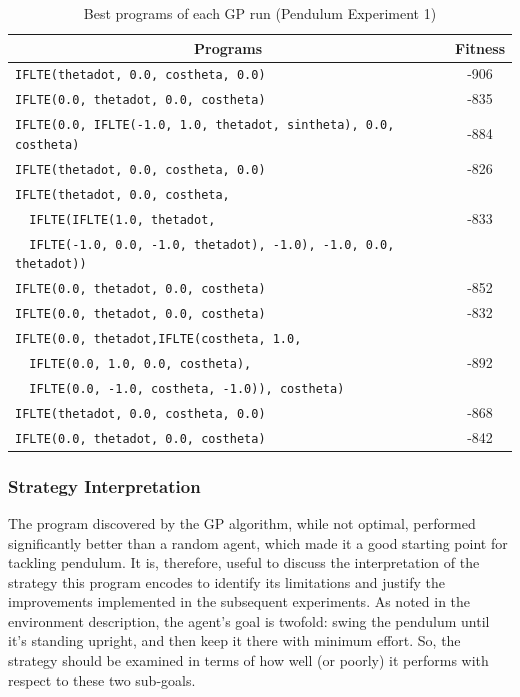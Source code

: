 \begin{table}[ht]
    \centering
    \begin{tabular}{|l|c|}
        \hline
        \multicolumn{1}{|c|}{\textbf{Programs}} & \textbf{Fitness} \\
        \hline
        
        \verb+IFLTE(thetadot, 0.0, costheta, 0.0)+ & -906  \\ \hline
        \verb+IFLTE(0.0, thetadot, 0.0, costheta)+ & -835  \\ \hline
        \verb+IFLTE(0.0, IFLTE(-1.0, 1.0, thetadot, sintheta), 0.0, costheta)+ & -884  \\ \hline
        \verb+IFLTE(thetadot, 0.0, costheta, 0.0)+ & -826  \\ \hline
        
        \verb+IFLTE(thetadot, 0.0, costheta,+ & \\
        \verb+  IFLTE(IFLTE(1.0, thetadot,+ & -833 \\
        \verb+  IFLTE(-1.0, 0.0, -1.0, thetadot), -1.0), -1.0, 0.0, thetadot))+ & \\
        \hline
        
        \verb+IFLTE(0.0, thetadot, 0.0, costheta)+ & -852  \\ \hline
        \verb+IFLTE(0.0, thetadot, 0.0, costheta)+ & -832  \\ \hline
        
        \verb+IFLTE(0.0, thetadot,IFLTE(costheta, 1.0,+ & \\
        \verb+  IFLTE(0.0, 1.0, 0.0, costheta),+ & -892 \\
        \verb+  IFLTE(0.0, -1.0, costheta, -1.0)), costheta)+ & \\
        \hline
        
        \verb+IFLTE(thetadot, 0.0, costheta, 0.0)+ & -868  \\ \hline
        \verb+IFLTE(0.0, thetadot, 0.0, costheta)+ & -842  \\ \hline
    \end{tabular}
    \caption{Best programs of each GP run (Pendulum Experiment 1)}
    \label{tab:pendulum_exp1_best_programs}
\end{table}

\subsubsection{Strategy Interpretation}
The program discovered by the GP algorithm, while not optimal, performed significantly better than a random agent, which made it a good starting point for tackling pendulum. It is, therefore, useful to discuss the interpretation of the strategy this program encodes to identify its limitations and justify the improvements implemented in the subsequent experiments. As noted in the environment description, the agent's goal is twofold: swing the pendulum until it's standing upright, and then keep it there with minimum effort. So, the strategy should be examined in terms of how well (or poorly) it performs with respect to these two sub-goals. 

